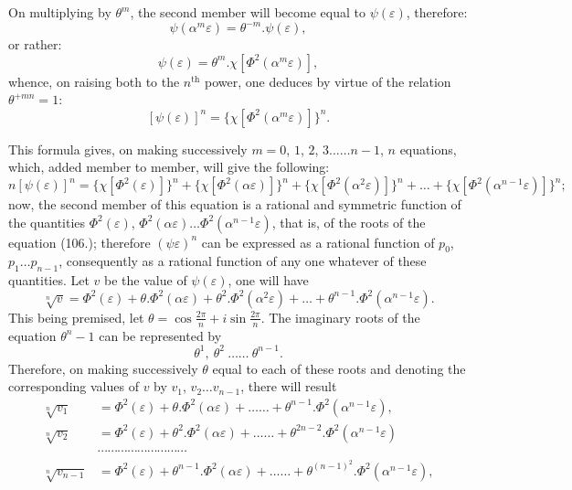 \documentclass{article}
\begin{document}
On multiplying by $\theta^{m}$, the second member will become equal to $\psi(\varepsilon)$, therefore:
\[ \psi(\alpha^{m}\varepsilon)=\theta^{-m}.\psi(\varepsilon), \tag{110.} \]
or rather:
\[ \psi(\varepsilon)=\theta^{m}.\chi[\Phi^{2}(\alpha^{m}\varepsilon)], \]
whence, on raising both to the $n^{\text{th}}$ power, one deduces by virtue of the relation $\theta^{+mn}=1$:
\[ [\psi(\varepsilon)]^{n}=\{\chi[\Phi^{2}(\alpha^{m}\varepsilon)]\}^{n}. \tag{111.} \]

This formula gives, on making successively $m=0$, $1$, $2$, $3\ldots\ldots n-1$, $n$ equations, which, added member to member, will give the following:
\[ n[\psi(\varepsilon)]^{n}=\{\chi[\Phi^{2}(\varepsilon)]\}^{n}+\{\chi[\Phi^{2}(\alpha\varepsilon)]\}^{n}+\{\chi[\Phi^{2}(\alpha^{2}\varepsilon)]\}^{n}+\ldots+\{\chi[\Phi^{2}(\alpha^{n-1}\varepsilon)]\}^{n}; \tag{112.} \]
now, the second member of this equation is a rational and symmetric function of the quantities $\Phi^{2}(\varepsilon)$, $\Phi^{2}(\alpha\varepsilon)\ldots\Phi^{2}(\alpha^{n-1}\varepsilon)$, that is, of the roots of the equation (106.); therefore $(\psi\varepsilon)^{n}$ can be expressed as a rational function of $p_{0}$, $p_{1}\ldots p_{n-1}$, consequently as a rational function of any one whatever of these quantities. Let $v$ be the value of $\psi(\varepsilon)$, one will have
\[ \sqrt[n]{v}=\Phi^{2}(\varepsilon)+\theta.\Phi^{2}(\alpha\varepsilon)+\theta^{2}.\Phi^{2}(\alpha^{2}\varepsilon)+\ldots+\theta^{n-1}.\Phi^{2}(\alpha^{n-1}\varepsilon). \tag{113.} \]
This being premised, let $\theta=\cos\frac{2\pi}{n}+i\sin\frac{2\pi}{n}$. The imaginary roots of the equation $\theta^{n}-1$ can be represented by
\[ \theta^{1},\ \theta^{2}\ \ldots\ldots\ \theta^{n-1}. \]
Therefore, on making successively $\theta$ equal to each of these roots and denoting the corresponding values of $v$ by $v_{1}$, $v_{2}\ldots v_{n-1}$, there will result
\[ \begin{aligned}
\sqrt[n]{v_{1}}&=\Phi^{2}(\varepsilon)+\theta.\Phi^{2}(\alpha\varepsilon)+\ldots\ldots+\theta^{n-1}.\Phi^{2}(\alpha^{n-1}\varepsilon),\\
\sqrt[n]{v_{2}}&=\Phi^{2}(\varepsilon)+\theta^{2}.\Phi^{2}(\alpha\varepsilon)+\ldots\ldots+\theta^{2n-2}.\Phi^{2}(\alpha^{n-1}\varepsilon)\\
&\cdots\cdots\cdots\cdots\cdots\cdots\cdots\cdots\cdots\\
\sqrt[n]{v_{n-1}}&=\Phi^{2}(\varepsilon)+\theta^{n-1}.\Phi^{2}(\alpha\varepsilon)+\ldots\ldots+\theta^{(n-1)^{2}}.\Phi^{2}(\alpha^{n-1}\varepsilon),
\end{aligned} \]
\end{document}
